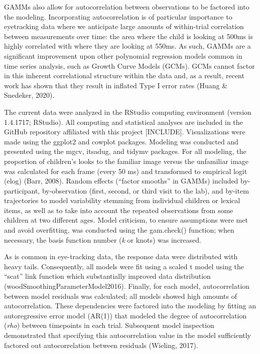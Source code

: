 \documentclass[
]{article}
\begin{document}
GAMMs also allow for autocorrelation between observations to be factored into the modeling. Incorporating autocorrelation is of particular importance to eyetracking data where we anticipate large amounts of within-trial correlation between measurements over time: the area where the child is looking at 500ms is highly correlated with where they are looking at 550ms. As such, GAMMs are a significant improvement upon other polynomial regression models common in time series analysis, such as Growth Curve Models (GCMs). GCMs cannot factor in this inherent correlational structure within the data and, as a result, recent work has shown that they result in inflated Type I error rates (Huang \& Snedeker, 2020).

The current data were analyzed in the RStudio computing environment (version 1.4.1717; RStudio). All computing and statistical analyses are included in the GitHub repository affiliated with this project {[}INCLUDE{]}. Visualizations were made using the ggplot2 and cowplot packages. Modeling was conducted and presented using the mgcv, itsadug, and tidymv packages. For all modeling, the proportion of children's looks to the familiar image versus the unfamiliar image was calculated for each frame (every 50 ms) and transformed to empirical logit (elog) (Barr, 2008). Random effects (``factor smooths'' in GAMMs) included by-participant, by-observation (first, second, or third visit to the lab), and by-item trajectories to model variability stemming from individual children or lexical items, as well as to take into account the repeated observations from some children at two different ages. Model criticism, to ensure assumptions were met and avoid overfitting, was conducted using the gam.check() function; when necessary, the basis function number (\emph{k} or knots) was increased.

As is common in eye-tracking data, the response data were distributed with heavy tails. Consequently, all models were fit using a scaled t model using the ``scat'' link function which substantially improved data distribution (woodSmoothingParameterModel2016). Finally, for each model, autocorrelation between model residuals was calculated; all models showed high amounts of autocorrelation. These dependencies were factored into the modeling by fitting an autoregressive error model (AR(1)) that modeled the degree of autocorrelation (\emph{rho}) between timepoints in each trial. Subsequent model inspection demonstrated that specifying this autocorrelation value in the model sufficiently factored out autocorrelation between residuals (Wieling, 2017).
\end{document}
